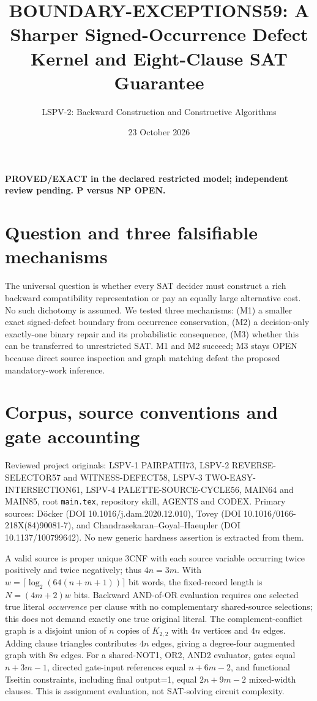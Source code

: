 \documentclass[11pt]{article}
\title{BOUNDARY-EXCEPTIONS59: A Sharper Signed-Occurrence Defect Kernel and Eight-Clause SAT Guarantee}
\author{LSPV-2: Backward Construction and Constructive Algorithms}
\date{23 October 2026}
\begin{document}
\maketitle
\begin{center}\textbf{PROVED/EXACT in the declared restricted model; independent review pending. P versus NP OPEN.}\end{center}

\section{Question and three falsifiable mechanisms}
The universal question is whether every SAT decider must construct a rich backward compatibility representation or pay an equally large alternative cost. No such dichotomy is assumed. We tested three mechanisms: (M1) a smaller exact signed-defect boundary from occurrence conservation, (M2) a decision-only exactly-one binary repair and its probabilistic consequence, (M3) whether this can be transferred to unrestricted SAT. M1 and M2 succeed; M3 stays OPEN because direct source inspection and graph matching defeat the proposed mandatory-work inference.

\section{Corpus, source conventions and gate accounting}
Reviewed project originals: LSPV-1 PAIRPATH73, LSPV-2 REVERSE-SELECTOR57 and WITNESS-DEFECT58, LSPV-3 TWO-EASY-INTERSECTION61, LSPV-4 PALETTE-SOURCE-CYCLE56, MAIN64 and MAIN85, root \texttt{main.tex}, repository skill, AGENTS and CODEX. Primary sources: D\"ocker (DOI 10.1016/j.dam.2020.12.010), Tovey (DOI 10.1016/0166-218X(84)90081-7), and Chandrasekaran--Goyal--Haeupler (DOI 10.1137/100799642). No new generic hardness assertion is extracted from them.

A valid source is proper unique 3CNF with each source variable occurring twice positively and twice negatively; thus $4n=3m$. With $w=\lceil\log_2(64(n+m+1))\rceil$ bit words, the fixed-record length is $N=(4m+2)w$ bits. Backward AND-of-OR evaluation requires one selected true literal \emph{occurrence} per clause with no complementary shared-source selections; this does not demand exactly one true original literal. The complement-conflict graph is a disjoint union of $n$ copies of $K_{2,2}$ with $4n$ vertices and $4n$ edges. Adding clause triangles contributes $4n$ edges, giving a degree-four augmented graph with $8n$ edges. For a shared-NOT1, OR2, AND2 evaluator, gates equal $n+3m-1$, directed gate-input references equal $n+6m-2$, and functional Tseitin constraints, including final output=1, equal $2n+9m-2$ mixed-width clauses. This is assignment evaluation, not SAT-solving circuit complexity.
\end{document}
